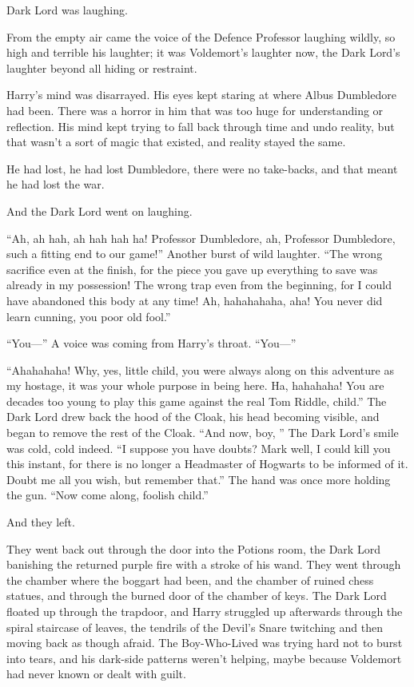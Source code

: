 
 Dark Lord was laughing.

\hplettrineextrapara
From the empty air came the voice of the Defence Professor laughing wildly, so high and terrible his laughter; it was Voldemort’s laughter now, the Dark Lord’s laughter beyond all hiding or restraint.

Harry’s mind was disarrayed. His eyes kept staring at where Albus Dumbledore had been. There was a horror in him that was too huge for understanding or reflection. His mind kept trying to fall back through time and undo reality, but that wasn’t a sort of magic that existed, and reality stayed the same.

He had lost, he had lost Dumbledore, there were no take-backs, and that meant he had lost the war.

And the Dark Lord went on laughing.

“Ah, ah hah, ah hah hah ha! Professor Dumbledore, ah, Professor Dumbledore, such a fitting end to our game!” Another burst of wild laughter. “The wrong sacrifice even at the finish, for the piece you gave up everything to save was already in my possession! The wrong trap even from the beginning, for I could have abandoned this body at any time! Ah, hahahahaha, aha! You never did learn cunning, you poor old fool.”

“You—” A voice was coming from Harry’s throat. “You—”

“Ahahahaha! Why, yes, little child, you were always along on this adventure as my hostage, it was your whole purpose in being here. Ha, hahahaha! You are decades too young to play this game against the real Tom Riddle, child.” The Dark Lord drew back the hood of the Cloak, his head becoming visible, and began to remove the rest of the Cloak. “And now, boy, ” The Dark Lord’s smile was cold, cold indeed. “I suppose you have doubts? Mark well, I could kill you this instant, for there is no longer a Headmaster of Hogwarts to be informed of it. Doubt me all you wish, but remember that.” The hand was once more holding the gun. “Now come along, foolish child.”

And they left.

They went back out through the door into the Potions room, the Dark Lord banishing the returned purple fire with a stroke of his wand. They went through the chamber where the boggart had been, and the chamber of ruined chess statues, and through the burned door of the chamber of keys. The Dark Lord floated up through the trapdoor, and Harry struggled up afterwards through the spiral staircase of leaves, the tendrils of the Devil’s Snare twitching and then moving back as though afraid. The Boy-Who-Lived was trying hard not to burst into tears, and his dark-side patterns weren’t helping, maybe because Voldemort had never known or dealt with guilt.

